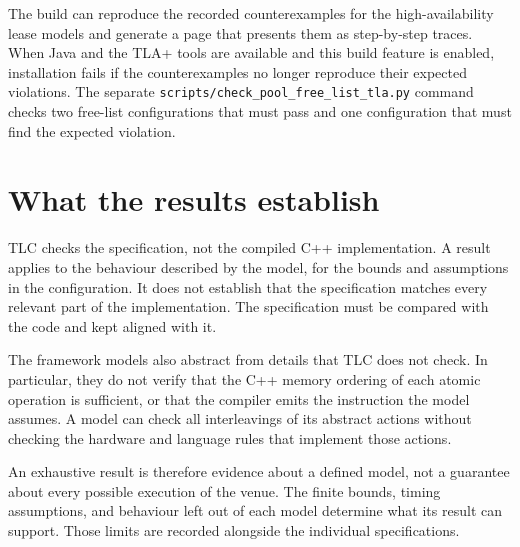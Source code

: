 The build can reproduce the recorded counterexamples for the high-availability lease
models and generate a page that presents them as step-by-step traces. When Java and the
TLA+ tools are available and this build feature is enabled, installation fails if the
counterexamples no longer reproduce their expected violations. The separate
\texttt{scripts/check\_pool\_free\_list\_tla.py} command checks two free-list
configurations that must pass and one configuration that must find the expected
violation.

\section{What the results establish}

TLC checks the specification, not the compiled C++ implementation. A result applies to
the behaviour described by the model, for the bounds and assumptions in the configuration.
It does not establish that the specification matches every relevant part of the
implementation. The specification must be compared with the code and kept aligned with
it.

The framework models also abstract from details that TLC does not check. In particular,
they do not verify that the C++ memory ordering of each atomic operation is sufficient,
or that the compiler emits the instruction the model assumes. A model can check all
interleavings of its abstract actions without checking the hardware and language rules
that implement those actions.

An exhaustive result is therefore evidence about a defined model, not a guarantee about
every possible execution of the venue. The finite bounds, timing assumptions, and
behaviour left out of each model determine what its result can support. Those limits are
recorded alongside the individual specifications.

